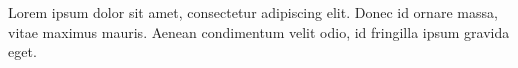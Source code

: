 
Lorem ipsum dolor sit amet, consectetur adipiscing elit. Donec id ornare massa, vitae maximus mauris. 
Aenean condimentum velit odio, id fringilla ipsum gravida eget.
